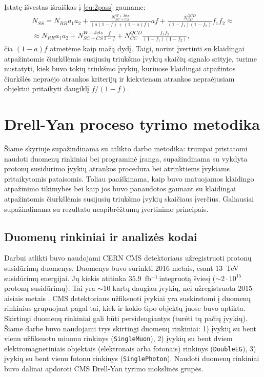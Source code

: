 \documentclass[a4paper, 12pt, oneside]{article}
\newcommand{\ttt}[1]{\texttt{#1}}
\newcommand{\WJets}{W\! +\!\mathrm{Jets}}
\newcommand{\invfb}{fb$^{-1}\,$}
\newcommand{\QCD}{QC\! D}
\newlength\q
\begin{document}
Įstatę išvestas išraiškas į \eqref{eq:2pass} gauname:
\begin{equation}
\label{eq:2passFR}
	\begin{gathered}
		N_{SS} = N_{RR} a_1 a_2 + \frac{N_{SC\!+\!CS}^{\WJets}}{(a(1-f)+(1-a)f)}af +
				    \frac{N_{CC}^{\QCD}}{(1-f_1)(1-f_2)}f_1f_2 \approx \\ \approx
					N_{RR} a_1 a_2 + N_{SC\!+\!CS}^{\WJets} \frac{f}{1-f} +
					N_{CC}^{\QCD} \frac{f_1 f_2}{(1-f_1)(1-f_2)}, 
	\end{gathered}
\end{equation}
čia $(1-a)f$ atmetėme kaip mažą dydį.
Taigi, norint įvertinti su klaidingai atpažintomis čiurkšlėmis susijusių triukšmo įvykių skaičių signalo srityje,
turime nustatyti, kiek buvo tokių triukšmo įvykių, kuriuose klaidingai atpažintos čiurkšlės nepraėjo atrankos
kriterijų ir kiekvienam atrankos nepraėjusiam objektui pritaikyti daugiklį $f/(1-f)$.


\newpage
\section{Drell-Yan proceso tyrimo metodika}
Šiame skyriuje supažindinama su atlikto darbo metodika: trumpai pristatomi naudoti duomenų rinkiniai bei programinė įranga,
supažindinama su vykdyta protonų susidūrimo įvykių atrankos procedūra bei atrinktiems įvykiams pritaikytomis pataisomis.
Toliau paaiškinama, kaip buvo matuojamos klaidingo atpažinimo tikimybės bei kaip jos buvo panaudotos gaunant su klaidingai
atpažintomis čiurkšlėmis susijusių triukšmo įvykių skaičiaus įverčius. Galiausiai supažindinama su rezultato neapibrėžtumų
įvertinimo principais.


\subsection{Duomenų rinkiniai ir analizės kodai}\label{sec:data}
Darbui atlikti buvo naudojami CERN CMS detektoriaus užregistruoti protonų susidūrimų duomenys.
Duomenys buvo surinkti 2016 metais, esant $13$~TeV susidūrimų energijai.
Jų kiekis atitinka $35.9$~\invfb integruotą šviesį ($\sim\!2 \cdot 10^{15}$ protonų susidūrimų).
Tai yra $\sim\!10$ kartų daugiau įvykių, nei užregistruota $2015$-aisiais metais \cite{DY_CMS2019}.
CMS detektoriaus užfiksuoti įvykiai yra suskirstomi į duomenų rinkinius grupuojant pagal tai,
kiek ir kokio tipo objektų juose buvo aptikta.
Skirtingi duomenų rinkiniai gali būti persidengiantys (turėti tų pačių įvykių).
Šiame darbe buvo naudojami trys skirtingi duomenų rinkiniai:
1) įvykių su bent vienu užfiksuotu miuonu rinkinys (\ttt{SingleMuon}),
2) įvykių su bent dviem elektromagnetiniais objektais (elektronais arba fotonais) rinkinys (\ttt{DoubleEG}),
3) įvykių su bent vienu fotonu rinkinys (\ttt{SinglePhoton}).
Naudoti duomenų rinkiniai buvo dalinai apdoroti CMS Drell-Yan tyrimo mokslinės grupės.
\end{document}
